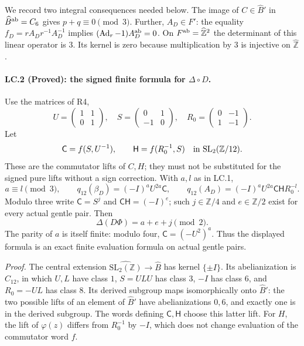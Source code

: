 We record two integral consequences needed below. The image of
$C\in\widehat B'$ in $\widehat B^{\rm ab}=C_6$ gives
$p+q\equiv0\pmod3$. Further, $A_D\in F'$: the equality
$f_D=rA_Dr^{-1}A_D^{-1}$ implies
$(\operatorname{Ad}_r-1)A_D^{\rm ab}=0$. On
$F^{\rm ab}=\widehat{\mathbb Z}^2$ the determinant of this linear
operator is $3$. Its kernel is zero because multiplication by $3$
is injective on $\widehat{\mathbb Z}$.

\paragraph{LC.2 (Proved): the signed finite formula for $\Delta\circ D$.}
Use the matrices of R4,
\[
 U=\begin{pmatrix}1&1\\0&1\end{pmatrix},\quad
 S=\begin{pmatrix}0&1\\-1&0\end{pmatrix},\quad
 R_0=\begin{pmatrix}0&-1\\1&-1\end{pmatrix}.
\]
Let
\[
 \mathsf C=f(S,U^{-1}),\qquad
 \mathsf H=f(R_0^{-1},S)
       \quad\hbox{in }\mathrm{SL}_2(\mathbb Z/12).
\]
These are the commutator lifts of $C,H$; they must not be substituted
for the signed pure lifts without a sign correction. With $a,l$ as
in LC.1,
\[
 a\equiv l\pmod3,\qquad
 q_{12}(\beta_D)=(-I)^aU^{2a}\mathsf C,\qquad
 q_{12}(A_D)=(-I)^aU^{2a}\mathsf C\mathsf H R_0^{-l}.
\]
Modulo three write
$\mathsf C=S^j$ and $\mathsf C\mathsf H=(-I)^e$; such
$j\in\mathbb Z/4$ and $e\in\mathbb Z/2$ exist for every actual
gentle pair. Then
\[
 \boxed{\ \Delta(D\Phi)=a+e+j\pmod2.\ }
\]
The parity of $a$ is itself finite: modulo four,
$\mathsf C=(-U^2)^a$. Thus the displayed formula is an exact
finite evaluation formula on actual gentle pairs.

\emph{Proof.}
The central extension $\widehat{\mathrm{SL}_2(\mathbb Z)}\to
\widehat B$ has kernel $\{\pm I\}$. Its abelianization is $C_{12}$,
in which $U,L$ have class $1$, $S=ULU$ has class $3$,
$-I$ has class $6$, and $R_0=-UL$ has class $8$.
Its derived subgroup maps isomorphically onto $\widehat B'$:
the two possible lifts of an element of $\widehat B'$ have
abelianizations $0,6$, and exactly one is in the derived subgroup.
The words defining $\mathsf C,\mathsf H$ choose this latter lift.
For $H$, the lift of $\varphi(z)$ differs from $R_0^{-1}$ by $-I$,
which does not change evaluation of the commutator word $f$.

